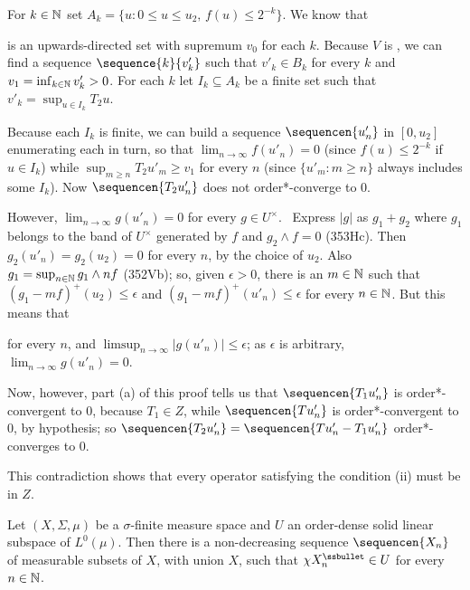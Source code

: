 {For $k\in\Bbb N$ set $A_k=\{u:0\le u\le u_2,\,f(u)\le 2^{-k}\}$.   We
know that


\noindent is an upwards-directed set with supremum $v_0$ for each $k$.
Because $V$ is \wsid, we can find a sequence $\sequence{k}{v'_k}$ such
that $v'_k\in B_k$ for every $k$ and $v_1=\inf_{k\in\Bbb N}v'_k>0$.
For each $k$ let $I_k\subseteq A_k$ be a finite set such that
$v'_k=\sup_{u\in I_k}T_2u$.

Because each $I_k$ is finite, we can build a sequence $\sequencen{u'_n}$
in $[0,u_2]$ enumerating each in turn, so that
$\lim_{n\to\infty}f(u'_n)=0$ (since $f(u)\le 2^{-k}$ if $u\in I_k$)
while $\sup_{m\ge n}T_2u'_m\ge v_1$ for every $n$ (since $\{u'_m:m\ge
n\}$ always includes some $I_k$).   Now $\sequencen{T_2u'_n}$ does not
order*-converge to $0$.

However, $\lim_{n\to\infty}g(u'_n)=0$ for every $g\in U^{\times}$.
\Prf\ Express $|g|$ as $g_1+g_2$ where $g_1$ belongs to the band of
$U^{\times}$ generated by $f$ and $g_2\wedge f=0$ (353Hc).   Then
$g_2(u'_n)=g_2(u_2)=0$ for every $n$, by the choice of $u_2$.   Also
$g_1=\sup_{n\in\Bbb N}g_1\wedge nf$ (352Vb);  so, given
$\epsilon>0$, there is an $m\in\Bbb N$ such that
$(g_1-mf)^+(u_2)\le\epsilon$ and $(g_1-mf)^+(u'_n)\le\epsilon$ for every
$n\in\Bbb N$.   But this means that


\noindent for every $n$, and $\limsup_{n\to\infty}|g(u'_n)|\le\epsilon$;
as $\epsilon$ is arbitrary, $\lim_{n\to\infty}g(u'_n)=0$.\ \Qed

Now, however, part (a) of this proof tells us that $\sequencen{T_1u'_n}$
is order*-convergent to $0$, because $T_1\in Z$, while
$\sequencen{Tu'_n}$ is order*-convergent to $0$, by hypothesis;  so
$\sequencen{T_2u'_n}=\sequencen{Tu'_n-T_1u'_n}$ order*-converges to
$0$.\ \Bang

This contradiction shows that every operator satisfying the condition
(ii) must be in $Z$.
}%

 Let $(X,\Sigma,\mu)$ be a $\sigma$-finite measure
space and $U$ an order-dense solid linear subspace of $L^0(\mu)$.   Then
there is a non-decreasing sequence $\sequencen{X_n}$ of measurable
subsets of $X$, with union $X$, such that $\chi X_n^{\ssbullet}\in U$
for every $n\in\Bbb N$.

